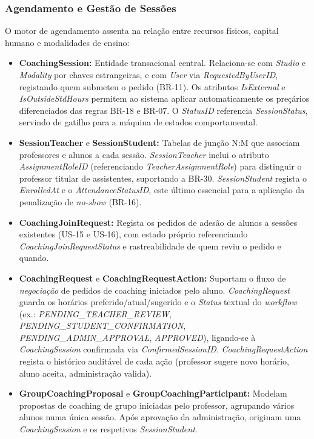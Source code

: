 \documentclass[12pt,a4paper]{report}
\begin{document}
\subsubsection{Agendamento e Gestão de Sessões}
O motor de agendamento assenta na relação entre recursos físicos, capital humano e modalidades de ensino:
\begin{itemize}
    \item \textbf{CoachingSession:} Entidade transacional central. Relaciona-se com \textit{Studio} e \textit{Modality} por chaves estrangeiras, e com \textit{User} via \textit{RequestedByUserID}, registando quem submeteu o pedido (BR-11). Os atributos \textit{IsExternal} e \textit{IsOutsideStdHours} permitem ao sistema aplicar automaticamente os preçários diferenciados das regras BR-18 e BR-07. O \textit{StatusID} referencia \textit{SessionStatus}, servindo de gatilho para a máquina de estados comportamental.
    \item \textbf{SessionTeacher} e \textbf{SessionStudent:} Tabelas de junção N:M que associam professores e alunos a cada sessão. \textit{SessionTeacher} inclui o atributo \textit{AssignmentRoleID} (referenciando \textit{TeacherAssignmentRole}) para distinguir o professor titular de assistentes, suportando a BR-30. \textit{SessionStudent} regista o \textit{EnrolledAt} e o \textit{AttendanceStatusID}, este último essencial para a aplicação da penalização de \textit{no-show} (BR-16).
    \item \textbf{CoachingJoinRequest:} Regista os pedidos de adesão de alunos a sessões existentes (US-15 e US-16), com estado próprio referenciando \textit{CoachingJoinRequestStatus} e rastreabilidade de quem reviu o pedido e quando.
    \item \textbf{CoachingRequest} e \textbf{CoachingRequestAction:} Suportam o fluxo de \textit{negociação} de pedidos de coaching iniciados pelo aluno. \textit{CoachingRequest} guarda os horários preferido/atual/sugerido e o \textit{Status} textual do \textit{workflow} (ex.: \textit{PENDING\_TEACHER\_REVIEW}, \textit{PENDING\_STUDENT\_CONFIRMATION}, \textit{PENDING\_ADMIN\_APPROVAL}, \textit{APPROVED}), ligando-se à \textit{CoachingSession} confirmada via \textit{ConfirmedSessionID}. \textit{CoachingRequestAction} regista o histórico auditável de cada ação (professor sugere novo horário, aluno aceita, administração valida).
    \item \textbf{GroupCoachingProposal} e \textbf{GroupCoachingParticipant:} Modelam propostas de coaching de grupo iniciadas pelo professor, agrupando vários alunos numa única sessão. Após aprovação da administração, originam uma \textit{CoachingSession} e os respetivos \textit{SessionStudent}.

\end{itemize}
\end{document}
